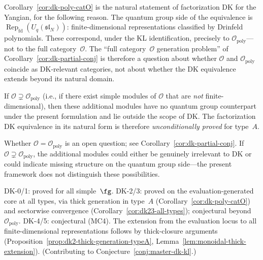 \begin{remark}
\label{rem:poly-O-natural-domain}
Corollary~\ref{cor:dk-poly-catO} is the natural statement of
factorization DK for the Yangian, for the following reason.
The quantum group side of the equivalence is
$\operatorname{Rep}_{\mathrm{fd}}(U_q(\mathfrak{sl}_N))$: finite-dimensional
representations classified by Drinfeld polynomials.  These correspond,
under the KL identification, precisely to
$\mathcal{O}_{\mathrm{poly}}$---not to the full category~$\mathcal{O}$.
The ``full category~$\mathcal{O}$ generation problem'' of
Corollary~\ref{cor:dk-partial-conj}
is therefore a question about whether
$\mathcal{O}$ and $\mathcal{O}_{\mathrm{poly}}$ coincide as DK-relevant
categories, not about whether the DK equivalence extends beyond its
natural domain.

If $\mathcal{O} \supsetneq \mathcal{O}_{\mathrm{poly}}$ (i.e., if
there exist simple modules of $\mathcal{O}$ that are \emph{not}
finite-dimensional), then these additional modules have no quantum
group counterpart under the present formulation and lie outside the
scope of DK\@.  The factorization DK equivalence in its natural form
is therefore \emph{unconditionally proved} for type~$A$.

Whether $\mathcal{O} = \mathcal{O}_{\mathrm{poly}}$ is an open
question; see Corollary~\ref{cor:dk-partial-conj}.
If $\mathcal{O} \supsetneq \mathcal{O}_{\mathrm{poly}}$, the
additional modules could either be genuinely irrelevant to DK or
could indicate missing structure on the quantum group side---the
present framework does not distinguish these possibilities.
\end{remark}

\begin{remark}
\label{rem:dk-fd-synthesis}
DK-0/1: proved for all simple~$\fg$.  DK-2/3: proved on the evaluation-generated core at all types, via thick generation in type~$A$ (Corollary~\ref{cor:dk-poly-catO}) and sectorwise convergence (Corollary~\ref{cor:dk23-all-types}); conjectural beyond $\mathcal{O}_{\mathrm{poly}}$.  DK-4/5: conjectural (MC4).  The extension from the evaluation locus to all finite-dimensional representations follows by thick-closure arguments (Proposition~\ref{prop:dk2-thick-generation-typeA}, Lemma~\ref{lem:monoidal-thick-extension}).
(Contributing to Conjecture~\ref{conj:master-dk-kl}.)
\end{remark}

